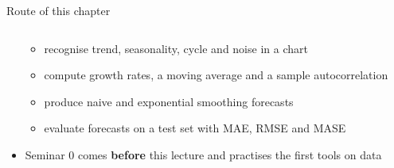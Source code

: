 \begin{frame}{Route of this chapter}
\begin{columns}[T]
\begin{column}{0.50\textwidth}
\begin{itemize}
\begin{itemize}
        \item recognise trend, seasonality, cycle and noise in a chart
        \item compute growth rates, a moving average and a sample autocorrelation
        \item produce naive and exponential smoothing forecasts
        \item evaluate forecasts on a test set with MAE, RMSE and MASE
    \end{itemize}
    \item Seminar 0 comes \textbf{before} this lecture and practises the first tools on data
\end{itemize}
\end{column}
\end{columns}
\end{frame}

